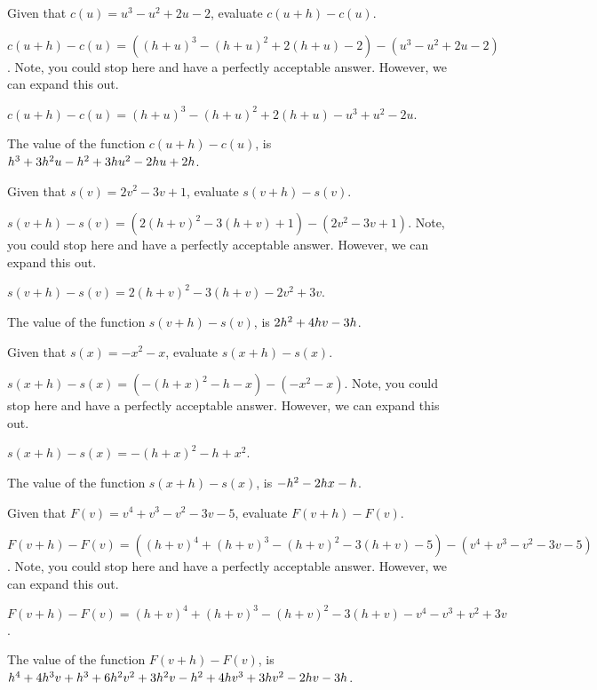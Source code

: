 \begin{shuffle}
\begin{exercise}
Given that $c(u)=u^3-u^2+2 u-2$, evaluate $c(u+h)-c(u)$.
\begin{solution}
\begin{hint}
$c(u+h)-c(u)=((h+u)^3-(h+u)^2+2 (h+u)-2)-(u^3-u^2+2 u-2)$. Note, you could stop here and have a perfectly acceptable answer. However, we can expand this out.
\end{hint}
\begin{hint}
$c(u+h)-c(u)=(h+u)^3-(h+u)^2+2 (h+u)-u^3+u^2-2 u$.
\end{hint}
The value of the function $c(u+h)-c(u)$, is ${h^3+3 h^2 u-h^2+3 h u^2-2 h u+2 h}$.
\end{solution}
\end{exercise}

\begin{exercise}
Given that $s(v)=2 v^2-3 v+1$, evaluate $s(v+h)-s(v)$.
\begin{solution}
\begin{hint}
$s(v+h)-s(v)=(2 (h+v)^2-3 (h+v)+1)-(2 v^2-3 v+1)$. Note, you could stop here and have a perfectly acceptable answer. However, we can expand this out.
\end{hint}
\begin{hint}
$s(v+h)-s(v)=2 (h+v)^2-3 (h+v)-2 v^2+3 v$.
\end{hint}
The value of the function $s(v+h)-s(v)$, is ${2 h^2+4 h v-3 h}$.
\end{solution}
\end{exercise}

\begin{exercise}
Given that $s(x)=-x^2-x$, evaluate $s(x+h)-s(x)$.
\begin{solution}
\begin{hint}
$s(x+h)-s(x)=(-(h+x)^2-h-x)-(-x^2-x)$. Note, you could stop here and have a perfectly acceptable answer. However, we can expand this out.
\end{hint}
\begin{hint}
$s(x+h)-s(x)=-(h+x)^2-h+x^2$.
\end{hint}
The value of the function $s(x+h)-s(x)$, is ${-h^2-2 h x-h}$.
\end{solution}
\end{exercise}

\begin{exercise}
Given that $F(v)=v^4+v^3-v^2-3 v-5$, evaluate $F(v+h)-F(v)$.
\begin{solution}
\begin{hint}
$F(v+h)-F(v)=((h+v)^4+(h+v)^3-(h+v)^2-3 (h+v)-5)-(v^4+v^3-v^2-3 v-5)$. Note, you could stop here and have a perfectly acceptable answer. However, we can expand this out.
\end{hint}
\begin{hint}
$F(v+h)-F(v)=(h+v)^4+(h+v)^3-(h+v)^2-3 (h+v)-v^4-v^3+v^2+3 v$.
\end{hint}
The value of the function $F(v+h)-F(v)$, is ${h^4+4 h^3 v+h^3+6 h^2 v^2+3 h^2 v-h^2+4 h v^3+3 h v^2-2 h v-3 h}$.
\end{solution}
\end{exercise}


\end{shuffle}
